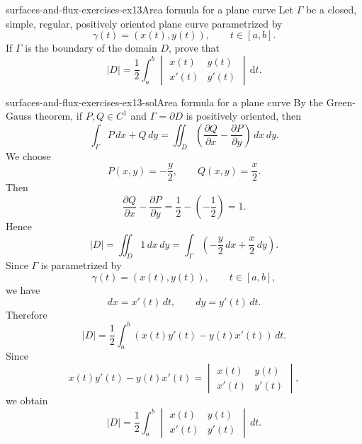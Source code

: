 \documentclass[preview]{standalone}
\begin{document}
\begin{snippetexercise}{surfaces-and-flux-exercises-ex13}{Area formula for a plane curve}
    Let \(\Gamma\) be a closed, simple, regular, positively oriented plane curve parametrized by \[\gamma(t)=(x(t),y(t)),\qquad t\in[a,b].\] If \(\Gamma\) is the boundary of the domain \(D\), prove that \[|D|=\frac{1}{2}\int_a^b
        \begin{vmatrix} x(t) & y(t) \\ x'(t) & y'(t)
    \end{vmatrix}\,\mathrm{d}t.\]
\end{snippetexercise}

\begin{snippetsolution}{surfaces-and-flux-exercises-ex13-sol}{Area formula for a plane curve}
    By the Green-Gauss theorem, if \(P,Q\in C^1\) and \(\Gamma=\partial D\) is positively oriented, then
    \[
        \int_\Gamma P\,dx+Q\,dy
        =
        \iint_D
        \left(
            \frac{\partial Q}{\partial x}
            -
            \frac{\partial P}{\partial y}
        \right)
        \,dx\,dy.
    \]
    We choose
    \[
        P(x,y)=-\frac{y}{2},
        \qquad
        Q(x,y)=\frac{x}{2}.
    \]
    Then
    \[
        \frac{\partial Q}{\partial x}
        -
        \frac{\partial P}{\partial y}
        =
        \frac{1}{2}-\left(-\frac{1}{2}\right)
        =
        1.
    \]
    Hence
    \[
        |D|
        =
        \iint_D 1\,dx\,dy
        =
        \int_\Gamma
        \left(
            -\frac{y}{2}\,dx+\frac{x}{2}\,dy
        \right).
    \]
    Since \(\Gamma\) is parametrized by
    \[
        \gamma(t)=(x(t),y(t)),
        \qquad t\in[a,b],
    \]
    we have
    \[
        dx=x'(t)\,dt,
        \qquad
        dy=y'(t)\,dt.
    \]
    Therefore
    \[
        |D|
        =
        \frac{1}{2}
        \int_a^b
        \left(
            x(t)y'(t)-y(t)x'(t)
        \right)
        \,dt.
    \]
    Since
    \[
        x(t)y'(t)-y(t)x'(t)
        =
        \begin{vmatrix}
            x(t) & y(t) \\
            x'(t) & y'(t)
        \end{vmatrix},
    \]
    we obtain
    \[
        |D|
        =
        \frac{1}{2}\int_a^b
        \begin{vmatrix}
            x(t) & y(t) \\
            x'(t) & y'(t)
        \end{vmatrix}
        \,dt.
    \]
\end{snippetsolution}
\end{document}
